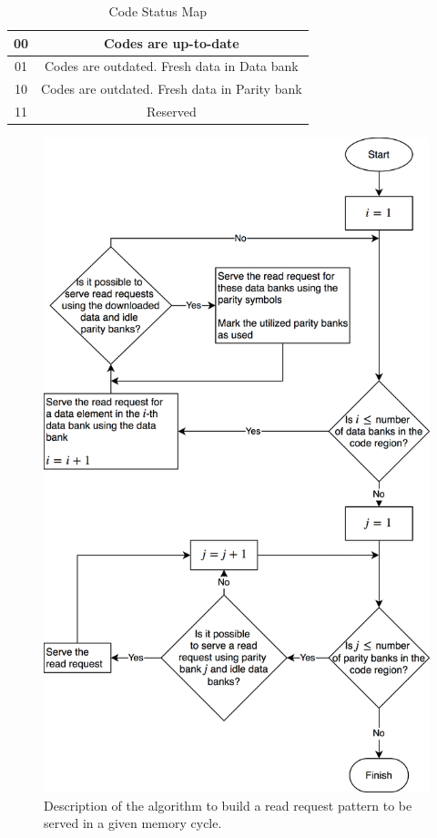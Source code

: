 \begin{table}[h!]
	\centering
	\begin{tabular}{|c | c|}
\hline
00 &  {Codes are up-to-date}\\ \hline 
01 &  Codes are outdated. Fresh data in Data bank \\ \hline 
10 &  Codes are outdated. Fresh data in Parity bank \\ \hline 
11 &  Reserved \\
\hline
\end{tabular}
\caption{Code Status Map}
\label{table:codestatusmap}
\end{table}
\begin{figure}[t!]
	\includegraphics[width=0.96\linewidth]{fig/read_pattern_algo.png}
	\caption{{Description of the algorithm to build a read request pattern to be served in a given memory cycle.}}
	\label{fig:readAlgo}
\end{figure}
